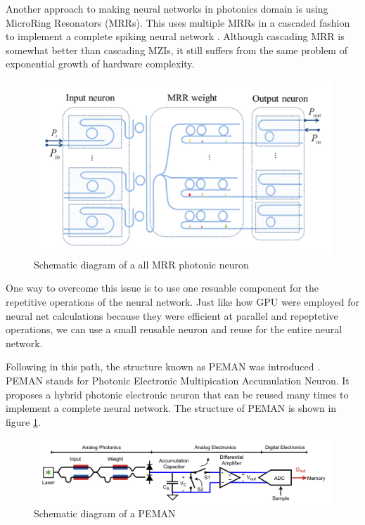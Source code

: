 Another approach to making neural networks in photonics domain is using MicroRing Resonators (MRRs). This uses multiple MRRs in a cascaded fashion to implement a complete spiking neural network \cite{photonics9020120}. Although cascading MRR is somewhat better than cascading MZIs, it still suffers from the same problem of exponential growth of hardware complexity.

\begin{figure}
	\centering
	\includegraphics[scale=0.7]{images/cascadedMRR.png}
	\caption{Schematic diagram of a all MRR photonic neuron \cite{photonics9020120}}
\end{figure}

One way to overcome this issue is to use one resuable component for the repetitive operations of the neural network. Just like how GPU were employed for neural net calculations because they were efficient at parallel and repeptetive operations, we can use a small reusable neuron and reuse for the entire neural network.

Following in this path, the structure known as PEMAN was introduced \cite{demarinisCodesignedIntegratedPhotonic2022}. PEMAN stands for Photonic Electronic Multipication Accumulation Neuron. It proposes a hybrid photonic electronic neuron that can be reused many times to implement a complete neural network. The structure of PEMAN is shown in figure \ref{peman}.

\begin{figure}
	\centering
	\includegraphics[width=\textwidth]{images/peman.png}
	\caption{Schematic diagram of a PEMAN \cite{demarinisCodesignedIntegratedPhotonic2022}}
	\label{peman}
\end{figure}

